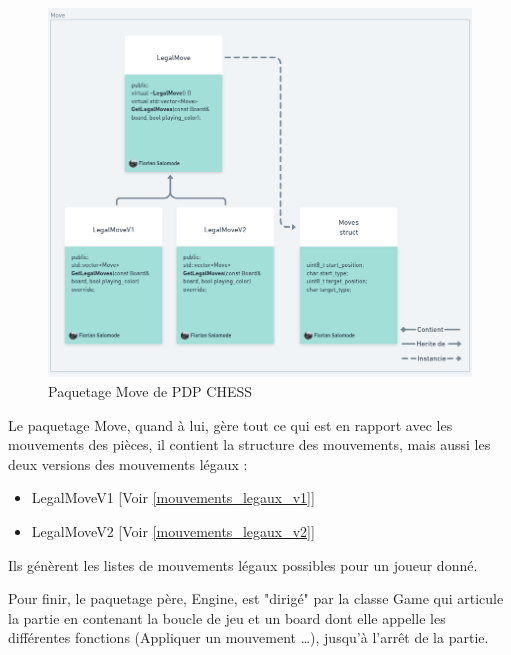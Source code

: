 \huge\documentclass{article}
\begin{document}
\begin{figure}[!h]
    \centering
    \includegraphics[scale = 0.3]{img/Package/Move.png}
    \caption{Paquetage Move de PDP CHESS}
    \label{pck:move}
\end{figure}
Le paquetage Move, quand à lui, gère tout ce qui est en rapport avec les mouvements des pièces, il contient la structure des mouvements, mais aussi les deux versions des mouvements légaux :
\begin{itemize}
    \item LegalMoveV1 [Voir \ref{mouvements_legaux_v1}]
    \item LegalMoveV2 [Voir \ref{mouvements_legaux_v2}]
\end{itemize}
Ils génèrent les listes de mouvements légaux possibles pour un joueur donné.
\medskip

Pour finir, le paquetage père, Engine, est "dirigé" par la classe Game qui articule la partie en contenant la boucle de jeu et un board dont elle appelle les différentes fonctions (Appliquer un mouvement \dots), jusqu'à l'arrêt de la partie.
\end{document}
